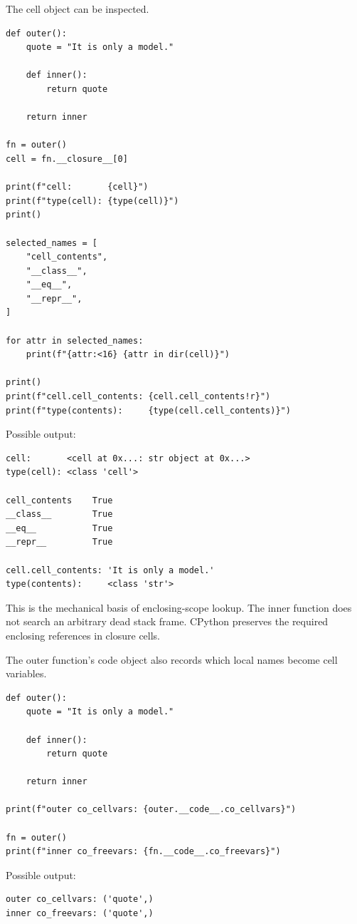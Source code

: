 The cell object can be inspected.

\begin{verbatim}
def outer():
    quote = "It is only a model."

    def inner():
        return quote

    return inner

fn = outer()
cell = fn.__closure__[0]

print(f"cell:       {cell}")
print(f"type(cell): {type(cell)}")
print()

selected_names = [
    "cell_contents",
    "__class__",
    "__eq__",
    "__repr__",
]

for attr in selected_names:
    print(f"{attr:<16} {attr in dir(cell)}")

print()
print(f"cell.cell_contents: {cell.cell_contents!r}")
print(f"type(contents):     {type(cell.cell_contents)}")
\end{verbatim}

Possible output:

\begin{verbatim}
cell:       <cell at 0x...: str object at 0x...>
type(cell): <class 'cell'>

cell_contents    True
__class__        True
__eq__           True
__repr__         True

cell.cell_contents: 'It is only a model.'
type(contents):     <class 'str'>
\end{verbatim}

This is the mechanical basis of enclosing-scope lookup. The inner function does not search an arbitrary dead stack frame. CPython preserves the required enclosing references in closure cells.

The outer function's code object also records which local names become cell variables.

\begin{verbatim}
def outer():
    quote = "It is only a model."

    def inner():
        return quote

    return inner

print(f"outer co_cellvars: {outer.__code__.co_cellvars}")

fn = outer()
print(f"inner co_freevars: {fn.__code__.co_freevars}")
\end{verbatim}

Possible output:

\begin{verbatim}
outer co_cellvars: ('quote',)
inner co_freevars: ('quote',)
\end{verbatim}


